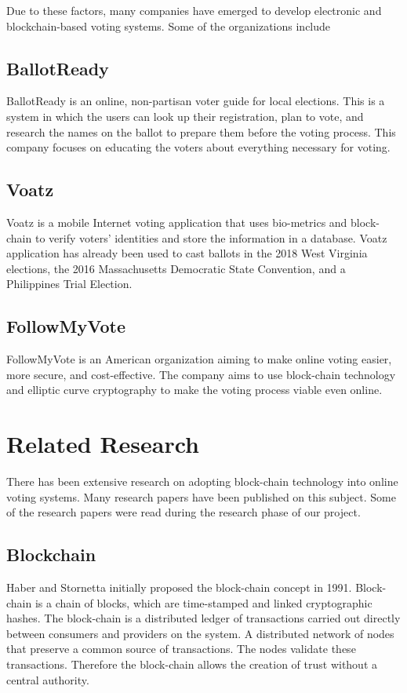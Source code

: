 \documentclass[a4paper,12pt]{report}
\begin{document}
Due to these factors, many companies have emerged to develop electronic and blockchain-based voting systems. Some of the organizations include

\subsection{BallotReady}
BallotReady is an online, non-partisan voter guide for local elections. This is a system in which the users can look up their registration, plan to vote, and research the names on the ballot to prepare them before the voting process. This company focuses on educating the voters about everything necessary for voting.

\subsection{Voatz}
Voatz is a mobile Internet voting application that uses bio-metrics and block-chain to verify voters' identities and store the information in a database. Voatz application has already been used to cast ballots in the 2018 West Virginia elections, the 2016 Massachusetts Democratic State Convention, and a Philippines Trial Election.

\subsection{FollowMyVote}
FollowMyVote is an American organization aiming to make online voting easier, more secure, and cost-effective. The company aims to use block-chain technology and elliptic curve cryptography to make the voting process viable even online.

\section{Related Research}
There has been extensive research on adopting block-chain technology into online voting systems. Many research papers have been published on this subject. Some of the research papers were read during the research phase of our project.

\subsection{Blockchain}
Haber and Stornetta initially proposed the block-chain concept in 1991. Block-chain is a chain of blocks, which are time-stamped and linked cryptographic hashes. The block-chain is a distributed ledger of transactions carried out directly between consumers and providers on the system. A distributed network of nodes that preserve a common source of transactions. The nodes validate these transactions. Therefore the block-chain allows the creation of trust without a central authority.
\end{document}
